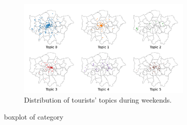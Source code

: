 \documentclass{article}
\theoremstyle{definition}
\theoremstyle{remark}
\begin{document}
\begin{figure}[!h]
\centering
\includegraphics[width=0.75\textwidth]{figures/topics_distribution_weekend_tourists.png}
\caption{\label{fig:topics_distribution_weekend_tourists}Distribution of tourists' topics during weekends.}
\end{figure}







boxplot of category




\end{document}
